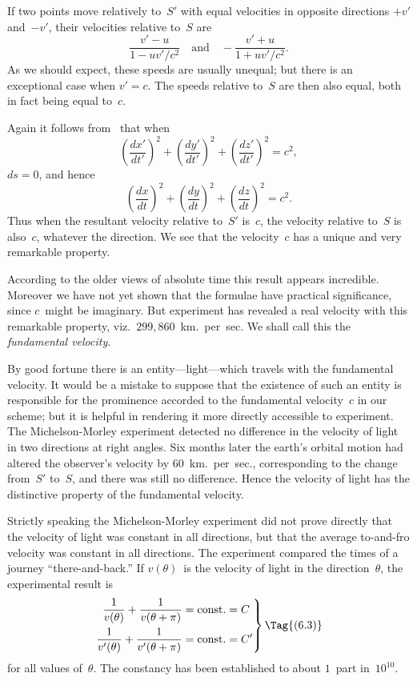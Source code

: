 \documentclass[12pt]{book}
\begin{document}
If two points move relatively to~$S'$ with equal velocities in opposite
directions $+v'$ and~$-v'$, their velocities relative to~$S$ are
\[
\frac{v' - u}{1 - u v'/c^{2}}\quad\text{and}\quad
-\frac{v' + u}{1 + u v'/c^{2}}.
\]
As we should expect, these speeds are usually unequal; but there is an exceptional
case when $v' = c$. The speeds relative to~$S$ are then also equal, both
in fact being equal to~$c$.

Again it follows from~ that when
\[
\left(\frac{dx'}{dt'}\right)^{2} + \left(\frac{dy'}{dt'}\right)^{2} + \left(\frac{dz'}{dt'}\right)^{2} = c^{2},
\]
$ds = 0$, and hence
\[
\left(\frac{dx}{dt}\right)^{2} + \left(\frac{dy}{dt}\right)^{2} + \left(\frac{dz}{dt}\right)^{2} = c^{2}.
\]
Thus when the resultant velocity relative to~$S'$ is~$c$, the velocity relative to~$S$
is also~$c$, whatever the direction. We see that the velocity~$c$ has a unique
and very remarkable property.

According to the older views of absolute time this result appears incredible.
Moreover we have not yet shown that the formulae have practical significance,
since $c$~might be imaginary. But experiment has revealed a real velocity
with this remarkable property, viz.\ $299,860$~km.\ per~sec. We shall call this
the \emph{fundamental velocity}.
%
%

By good fortune there is an entity---light---which travels with the fundamental
%
velocity. It would be a mistake to suppose that the existence of such
an entity is responsible for the prominence accorded to the fundamental velocity~$c$
in our scheme; but it is helpful in rendering it more directly accessible to
experiment. The Michelson-Morley experiment detected no difference in the
%
velocity of light in two directions at right angles. Six months later the earth's
%
orbital motion had altered the observer's velocity by $60$~km.\ per~sec., corresponding
to the change from~$S'$ to~$S$, and there was still no difference. Hence
the velocity of light has the distinctive property of the fundamental velocity.

Strictly speaking the Michelson-Morley experiment did not prove directly
that the velocity of light was constant in all directions, but that the average
to-and-fro velocity was constant in all directions. The experiment compared
the times of a journey ``there-and-back.'' If $v(\theta)$~is the velocity of light in
the direction~$\theta$, the experimental result is
\[
\left.
\begin{alignedat}{2}
  \frac{1}{v(\theta)} + \frac{1}{v(\theta + \pi)} &= \text{const.} &&= C \\
  \frac{1}{v'(\theta)} + \frac{1}{v'(\theta + \pi)} &= \text{const.} &&= C'
\end{alignedat}
\right\}
\Tag{(6.3)}
\]
for all values of~$\theta$. The constancy has been established to about $1$~part in~$10^{10}$.
\end{document}
